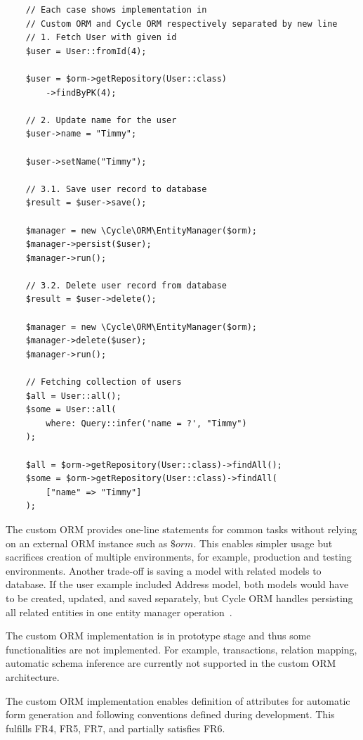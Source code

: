 \begin{verbatim}
    // Each case shows implementation in
    // Custom ORM and Cycle ORM respectively separated by new line
    // 1. Fetch User with given id
    $user = User::fromId(4);

    $user = $orm->getRepository(User::class)
        ->findByPK(4);

    // 2. Update name for the user
    $user->name = "Timmy";

    $user->setName("Timmy");

    // 3.1. Save user record to database
    $result = $user->save();

    $manager = new \Cycle\ORM\EntityManager($orm);
    $manager->persist($user);
    $manager->run();

    // 3.2. Delete user record from database
    $result = $user->delete();

    $manager = new \Cycle\ORM\EntityManager($orm);
    $manager->delete($user);
    $manager->run();

    // Fetching collection of users
    $all = User::all();
    $some = User::all(
        where: Query::infer('name = ?', "Timmy")
    );

    $all = $orm->getRepository(User::class)->findAll();
    $some = $orm->getRepository(User::class)->findAll(
        ["name" => "Timmy"]
    );
\end{verbatim}

The custom ORM provides one-line statements for common tasks without relying on an external ORM instance such as \(\$orm\).
This enables simpler usage but sacrifices creation of multiple environments, for example, production and testing environments.
Another trade-off is saving a model with related models to database.
If the user example included Address model, both models would have to be created, updated, and saved separately,
but Cycle ORM handles persisting all related entities in one entity manager operation~\parencite[Persisting Related Entities]{cycle_orm_crd}.

The custom ORM implementation is in prototype stage and thus some functionalities are not implemented.
For example, transactions, relation mapping, automatic schema inference are currently not supported in the custom ORM architecture.

The custom ORM implementation enables definition of attributes for automatic form generation and following conventions defined during development.
This fulfills FR4, FR5, FR7, and partially satisfies FR6.



